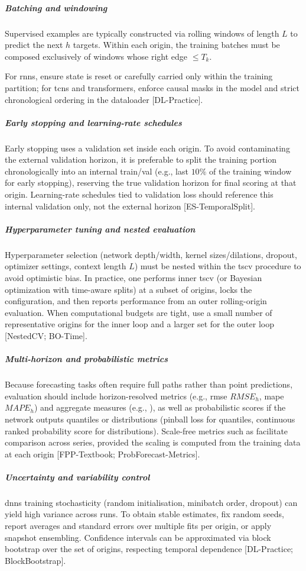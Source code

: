 \subparagraph {Batching and windowing} Supervised examples are typically constructed via rolling windows of length 
$L$ to predict the next  $h$ targets. Within each origin, the training batches must be composed exclusively of windows whose right edge $ \leq T_k$.

For \acrshort{rnns}, ensure state is reset or carefully carried only within the training partition; for \acrshort{tcns} and transformers, enforce causal masks in the model and strict chronological ordering in the dataloader [DL-Practice].

\subparagraph {Early stopping and learning-rate schedules} Early stopping uses a validation set inside each origin. To avoid contaminating the external validation horizon, it is preferable to split the training portion chronologically into an internal train/val (e.g., last $10\%$ of the training window for early stopping), reserving the true validation horizon for final scoring at that origin. Learning-rate schedules tied to validation loss should reference this internal validation only, not the external horizon [ES-TemporalSplit].

\subparagraph {Hyperparameter tuning and nested evaluation} Hyperparameter selection (network depth/width, kernel sizes/dilations, dropout, optimizer settings, context length 
$L$) must be nested within the \acrshort{tscv} procedure to avoid optimistic bias. In practice, one performs inner \acrshort{tscv} (or Bayesian optimization with time-aware splits) at a subset of origins, locks the configuration, and then reports performance from an outer rolling-origin evaluation. When computational budgets are tight, use a small number of representative origins for the inner loop and a larger set for the outer loop [NestedCV; BO-Time].

\subparagraph{Multi-horizon and probabilistic metrics} Because forecasting tasks often require full paths rather than point predictions, evaluation should include horizon-resolved metrics (e.g., \acrlong{rmse} $RMSE_h$, \acrlong{mape} $MAPE_h$) and aggregate measures (e.g.,  ), as well as probabilistic scores if the network outputs quantiles or distributions (pinball loss for quantiles, continuous ranked probability score for distributions). Scale-free metrics such as  facilitate comparison across series, provided the scaling is computed from the training data at each origin [FPP-Textbook; ProbForecast-Metrics].

\subparagraph{Uncertainty and variability control} \acrshort{dnns} training stochasticity (random initialisation, minibatch order, dropout) can yield high variance across runs. To obtain stable estimates, fix random seeds, report averages and standard errors over multiple fits per origin, or apply snapshot ensembling. Confidence intervals can be approximated via block bootstrap over the set of origins, respecting temporal dependence [DL-Practice; BlockBootstrap].


